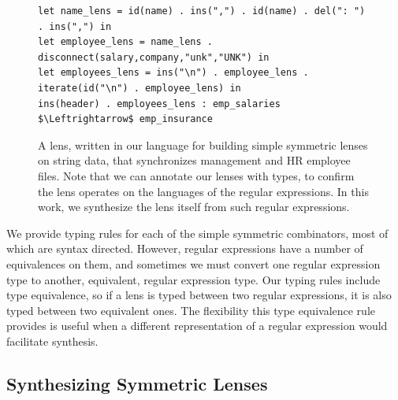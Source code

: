 \documentclass[acmsmall,screen,anonymous]{acmart}
\begin{document}
\begin{figure}
\begin{lstlisting}
let name_lens = id(name) . ins(",") . id(name) . del(": ") . ins(",") in
let employee_lens = name_lens . disconnect(salary,company,"unk","UNK") in
let employees_lens = ins("\n") . employee_lens . iterate(id("\n") . employee_lens) in
ins(header) . employees_lens : emp_salaries $\Leftrightarrow$ emp_insurance
\end{lstlisting}
  \caption{A lens, written in our language for building simple symmetric lenses
    on string data, that synchronizes management and HR employee files.
    Note that we can annotate our lenses with types, to confirm the lens
    operates on the languages of the regular expressions. In this work, we
    synthesize the lens itself from such regular expressions.}
  \label{fig:example_lens}
\end{figure}



We provide typing rules for each of the simple symmetric combinators, most of
which are syntax directed. However, regular expressions have a number of
equivalences on them, and sometimes we must convert one regular expression type
to another, equivalent, regular expression type. Our typing rules include type
equivalence, so if a lens is typed between two regular expressions, it is also
typed between two equivalent ones. The flexibility this type equivalence rule
provides is useful when a different representation of a regular expression would
facilitate synthesis.



\subsection{Synthesizing Symmetric Lenses}
\end{document}
